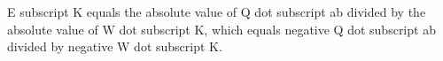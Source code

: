 E subscript K equals the absolute value of Q dot subscript ab divided by the absolute value of W dot subscript K, which equals negative Q dot subscript ab divided by negative W dot subscript K.